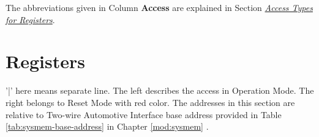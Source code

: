 \documentclass[main\_\_EN.tex]{subfiles}
\begin{document}
The abbreviations given in Column \textbf{Access} are explained in Section \hyperref[glossary-access-types]{\textit{Access Types for Registers}}.






\clearpage
\section{Registers}

'|' here means separate line. The left describes the access in Operation Mode. The right belongs to Reset Mode with red color. The addresses in this section are relative to Two-wire Automotive Interface base address provided in Table \ref{tab:sysmem-base-address} in Chapter \ref{mod:sysmem} \textit{}.


\end{document}
